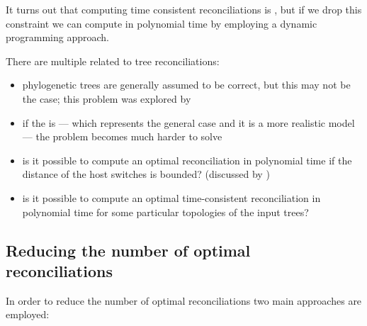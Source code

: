 \documentclass[a4paper, 12pt]{report}
\begin{document}

    It turns out that computing time consistent reconciliations is \NPHard, but if we drop this constraint we can compute  in polynomial time by employing a dynamic programming approach. 

    There are multiple  related to tree reconciliations:

    \begin{itemize}
        \item phylogenetic trees are generally assumed to be correct, but this may not be the case; this problem was explored by \textcite{sinaimeri}
        \item if the  is  --- which represents the general case and it is a more realistic model --- the problem becomes much harder to solve
        \item is it possible to compute an optimal reconciliation in polynomial time if the distance of the host switches is bounded? (discussed by \textcite{tavernelli})
        \item is it possible to compute an optimal time-consistent reconciliation in polynomial time for some particular topologies of the input trees?
    \end{itemize}

    \subsection{Reducing the number of optimal reconciliations}
    
    In order to reduce the number of optimal reconciliations two main approaches are employed:
\end{document}

